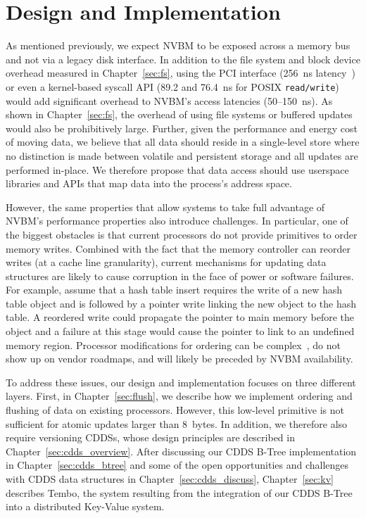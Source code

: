 \chapter{Design and Implementation}
\label{sec:design}

As mentioned previously, we expect NVBM to be exposed across a memory bus and
not via a legacy disk interface.  In addition to the file system and block
device overhead measured in Chapter~\ref{sec:fs}, using the PCI interface
(256~ns latency~\citep{Holden06}) or even a kernel-based syscall API (89.2 and
76.4~ns for POSIX \texttt{read/write}) would add significant overhead to NVBM's
access latencies (50--150~ns).  As shown in Chapter~\ref{sec:fs}, the overhead
of using file systems or buffered updates would also be prohibitively large.
Further, given the performance and energy cost of moving data, we believe that
all data should reside in a single-level store where no distinction is made
between volatile and persistent storage and all updates are performed in-place.
We therefore propose that data access should use userspace libraries and APIs
that map data into the process's address space.

However, the same properties that allow systems to take full advantage
of NVBM's performance properties also introduce challenges.  In
particular, one of the biggest obstacles is that current processors do
not provide primitives to order memory writes.  Combined with the fact
that the memory controller can reorder writes (at a cache line
granularity), current mechanisms for updating data structures are
likely to cause corruption in the face of power or software failures.
For example, assume that a hash table insert requires the write of a
new hash table object and is followed by a pointer write linking the
new object to the hash table.  A reordered write could propagate the
pointer to main memory before the object and a failure at this stage
would cause the pointer to link to an undefined memory region.
Processor modifications for ordering can be complex~\citep{Condit09},
do not show up on vendor roadmaps, and will likely be preceded by NVBM
availability.

To address these issues, our design and implementation focuses on
three different layers. First, in Chapter~\ref{sec:flush}, we describe
how we implement ordering and flushing of data on existing processors.
However, this low-level primitive is not sufficient for atomic updates
larger than 8~bytes.  In addition, we therefore also require 
versioning CDDSs, whose design principles are described in
Chapter~\ref{sec:cdds_overview}.  After discussing our CDDS B-Tree
implementation in Chapter~\ref{sec:cdds_btree} and some of the open
opportunities and challenges with CDDS data structures in
Chapter~\ref{sec:cdds_discuss}, Chapter~\ref{sec:kv} describes Tembo,
the system resulting from the integration of our CDDS B-Tree into a
distributed Key-Value system.

